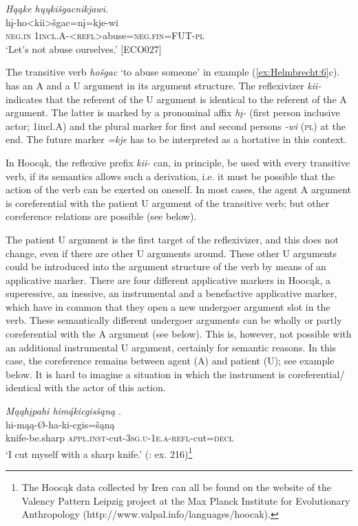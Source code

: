 \documentclass[output=paper]{langscibook}
\begin{document}
\ea \textit{ Hąąke hųųkišgacnikjawi.}
 \label{ex:Ref30155749}\\
	 {hį-ho<kii>šgac=nį=kje-wi}\\
	{\textsc{neg.in}}  {\textsc{1\textsc{incl}.A-<refl>}abuse=\textsc{neg.fin=FUT-\textsc{pl}}}\\
	\glt `Let's not abuse ourselves.' [ECO027]
\z 

The transitive verb \textit{hošgac} `to abuse someone' in example (\ref{ex:Helmbrecht:6}c). has an A and a U argument in its argument structure. The reflexivizer \textit{kii-} indicates that the referent of the U argument is identical to the referent of the A argument. The latter is marked by a pronominal affix \textit{hį-} (first person inclusive actor; 1incl.A) and the plural marker for first and second persons \textit{{}-wi} (\textsc{pl}) at the end. The future marker \textit{=kje} has to be interpreted as a hortative in this context.

In Hoocąk, the reflexive prefix \textit{kii-} can, in principle, be used with every transitive verb, if its semantics allows such a derivation, i.e. it must be possible that the action of the verb can be exerted on oneself. In most cases, the agent A argument is coreferential with the patient U argument of the transitive verb; but other coreference relations are possible (see  below). 

 The patient U argument is the first target of the reflexivizer, and this does not change, even if there are other U arguments around. These other U arguments could be introduced into the argument structure of the verb by means of an applicative marker. There are four different applicative markers in Hoocąk, a superessive, an inessive, an instrumental and a benefactive applicative marker, which have in common that they open a new undergoer argument slot in the verb. These semantically different undergoer arguments can be wholly or partly coreferential with the A argument (see  below). This is, however, not possible with an additional instrumental U argument, certainly for semantic reasons. In this case, the coreference remains between agent (A) and patient (U); see example  below. It is hard to imagine a situation in which the instrument is coreferential/ identical with the actor of this action.

\ea   \textit{ Mąąhįpahi himą́kicgisšąną } \label{ex:Helmbrecht:4}.\\
   {hi-mąą-Ø-ha-ki-cgis=šąną}\\
  {knife-be.sharp}  {\textsc{appl.inst}-cut-\textsc{3sg.u}-\textsc{1e.a}-\textsc{\textsc{refl}}-cut=\textsc{decl}}\\
  \glt `I cut myself with a sharp knife.'
 (\citealt{Hartmann2013}: ex. 216)\footnote{The Hoocąk data collected by Iren \citet{Hartmann2013} can all be found on the website of the Valency Pattern Leipzig project at the Max Planck Institute for Evolutionary Anthropology ({http://www.valpal.info/languages/hoocak}).}
\z   
  
\end{document}
